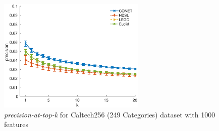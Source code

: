 \documentclass[twoside,11pt]{article}
\begin{document}
\begin{figure}[h]
\centering
\includegraphics[width=7cm]{precision@k_Caltech256_with_249Categories}
\caption*{\textit{precision-at-top-k} for Caltech256 (249 Categories) dataset with 1000 features}
\end{figure}


\vskip 0.2in

\end{document}
